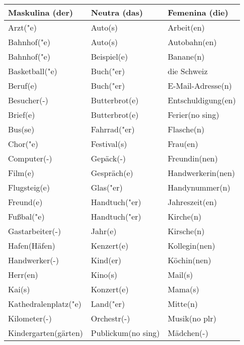 \documentclass{article}
\renewcommand{\arraystretch}{1}
\begin{document}
\begin{table}[h!]
    \centering
    \label{tab:tabla1}
    \renewcommand{\arraystretch}{1.5}
    \begin{tabular}{|>{\raggedright\arraybackslash}p{5cm}|>{\raggedright\arraybackslash}p{5cm}|>{\raggedright\arraybackslash}p{5cm}|}
        \hline
        \rowcolor{gray!20} \textbf{Maskulina (der)} & \textbf{Neutra (das)} & \textbf{Femenina (die)} \\
        \hline
        Arzt("e) & Auto(s) & Arbeit(en) \\\hline
        Bahnhof("e) & Auto(s) & Autobahn(en) \\\hline
        Bahnhof("e) & Beispiel(e) & Banane(n) \\\hline
        Basketball("e) & Buch("er) & die Schweiz \\\hline
        Beruf(e) & Buch("er) & E-Mail-Adresse(n) \\\hline
        Besucher(-) & Butterbrot(e) & Entschuldigung(en) \\\hline
        Brief(e) & Butterbrot(e) & Ferier(no sing) \\\hline
        Bus(se) & Fahrrad("er) & Flasche(n) \\\hline
        Chor("e) & Festival(s) & Frau(en) \\\hline
        Computer(-) & Gepäck(-) & Freundin(nen) \\\hline
        Film(e) & Gespräch(e) & Handwerkerin(nen) \\\hline
        Flugsteig(e) & Glas("er) & Handynummer(n) \\\hline
        Freund(e) & Handtuch("er) & Jahreszeit(en) \\\hline
        Fu\ss{}bal("e) & Handtuch("er) & Kirche(n) \\\hline
        Gastarbeiter(-) & Jahr(e) & Kirsche(n) \\\hline
        Hafen(Häfen) & Kenzert(e) & Kollegin(nen) \\\hline
        Handwerker(-) & Kind(er) & Köchin(nen) \\\hline
        Herr(en) & Kino(s) & Mail(s) \\\hline
        Kai(s) & Konzert(e) & Mama(s) \\\hline
        Kathedralenplatz("e) & Land("er) & Mitte(n) \\\hline
        Kilometer(-) & Orchestr(-) & Musik(no plr) \\\hline
        Kindergarten(gärten) & Publickum(no sing) & Mädchen(-) \\\hline

\end{tabular}
\end{table}
\end{document}
